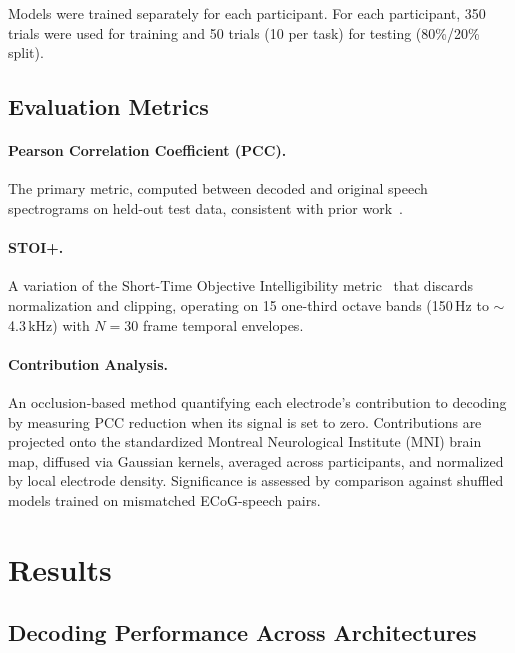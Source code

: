 \documentclass[11pt]{article}
\begin{document}
Models were trained separately for each participant. For each participant, 350 trials were used for training and 50 trials (10 per task) for testing (80\%/20\% split).

\subsection{Evaluation Metrics}

\paragraph{Pearson Correlation Coefficient (PCC).} The primary metric, computed between decoded and original speech spectrograms on held-out test data, consistent with prior work~\citep{angrick2019speech}.

\paragraph{STOI+.} A variation of the Short-Time Objective Intelligibility metric~\citep{jensen2016algorithm} that discards normalization and clipping, operating on 15 one-third octave bands (150\,Hz to $\sim$4.3\,kHz) with $N=30$ frame temporal envelopes.

\paragraph{Contribution Analysis.} An occlusion-based method quantifying each electrode's contribution to decoding by measuring PCC reduction when its signal is set to zero. Contributions are projected onto the standardized Montreal Neurological Institute (MNI) brain map, diffused via Gaussian kernels, averaged across participants, and normalized by local electrode density. Significance is assessed by comparison against shuffled models trained on mismatched ECoG-speech pairs.

\section{Results}

\subsection{Decoding Performance Across Architectures}
\end{document}
